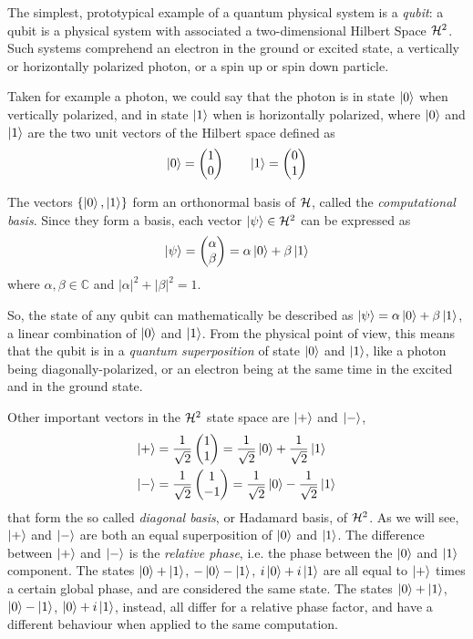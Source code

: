 The simplest, prototypical example of a quantum physical system is a \textit{qubit}: a qubit is a physical system with associated a two-dimensional Hilbert Space $\mathcal{H}^2$. Such systems comprehend an electron in the ground or excited state, a vertically or horizontally polarized photon, or a spin up or spin down particle.

Taken for example a photon, we could say that the photon is in state $\ket{0}$ when vertically polarized, and in state $\ket{1}$ when is horizontally polarized, where $\ket{0}$ and $\ket{1}$ are the two unit vectors of the Hilbert space defined as
\[
	\ket{0} = \begin{pmatrix}
	1 \\
	0
	\end{pmatrix} \qquad
	\ket{1} = \begin{pmatrix}
	0 \\
	1
	\end{pmatrix}
\]

The vectors $\{\ket{0}, \ket{1}\}$ form an orthonormal basis of $\mathcal{H}$, called the \textit{computational basis}. Since they form a basis, each vector $\ket{\psi} \in \mathcal{H}^2$ can be expressed as 
	\[\ket{\psi} = \begin{pmatrix}
	\alpha \\
	\beta
	\end{pmatrix} = 
	\alpha\ket{0} + \beta\ket{1}
	\]
where $\alpha, \beta \in \mathbb{C}$ and $|\alpha|^2 + |\beta|^2 = 1$.

So, the state of any qubit can mathematically be described as $\ket{\psi} = \alpha\ket{0} +\beta\ket{1}$, a linear combination of $\ket{0}$ and $\ket{1}$. From the physical point of view, this means that the qubit is in a \textit{quantum superposition} of state $\ket{0}$ and $\ket{1}$, like a photon being diagonally-polarized, or an electron being at the same time in the excited and in the ground state.

Other important vectors in the $\mathcal{H}^2$ state space are $\ket{+}$ and $\ket{-}$,
\begin{align*}
	\ket{+} = \frac{1}{\sqrt{2}} &\begin{pmatrix}
	1 \\
	1
	\end{pmatrix}  = \frac{1}{\sqrt{2}}\ket{0} + \frac{1}{\sqrt{2}}\ket{1}   \\
	\ket{-}  = \frac{1}{\sqrt{2}} &\begin{pmatrix}
	1 \\
	-1
	\end{pmatrix}  = \frac{1}{\sqrt{2}}\ket{0} - \frac{1}{\sqrt{2}}\ket{1} 
\end{align*}
that form the so called \textit{diagonal basis}, or Hadamard basis, of $\mathcal{H}^2$. As we will see, $\ket{+}$ and $\ket{-}$ are both an equal superposition of $\ket{0}$ and $\ket{1}$. The difference between $\ket{+}$ and $\ket{-}$ is the \textit{relative phase}, i.e. the phase between the $\ket{0}$ and $\ket{1}$ component. The states $\ket{0} + \ket{1}$, $-\ket{0} -\ket{1}$, $i\ket{0} + i\ket{1}$ are all equal to $\ket{+}$ times a certain global phase, and are considered the same state. The states $\ket{0} + \ket{1}$, $\ket{0} - \ket{1}$, $\ket{0} +i\ket{1}$, instead, all differ for a relative phase factor, and have a different behaviour when applied to the same computation. 
